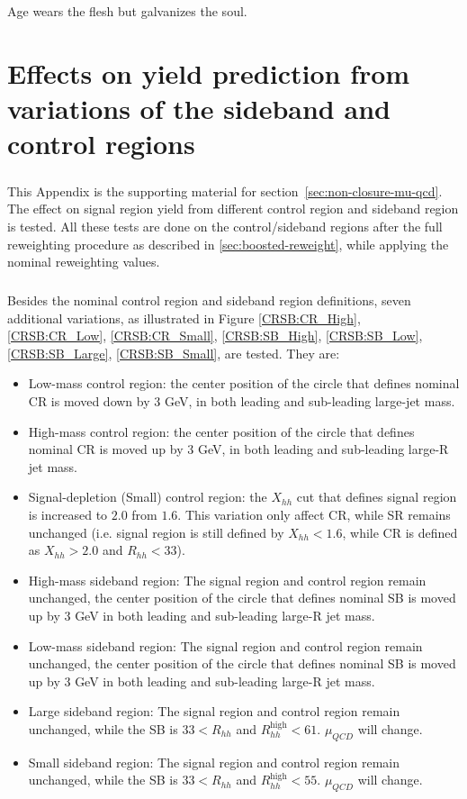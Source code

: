 \begin{savequote}[75mm]
Age wears the flesh but galvanizes the soul.   
\end{savequote}
\chapter{Effects on yield prediction from variations of the sideband and control regions}
\label{app:appendixSysVar}

\paragraph{}
This Appendix is the supporting material for section~\ref{sec:non-closure-mu-qcd}. 
The effect on signal region yield from different control region and sideband region is tested. 
All these tests are done on the control/sideband regions after the full reweighting procedure as described in \ref{sec:boosted-reweight}, while applying the nominal reweighting values.

\paragraph{}
Besides the nominal control region and sideband region definitions, seven additional variations, as illustrated in Figure \ref{CRSB:CR_High}, \ref{CRSB:CR_Low}, \ref{CRSB:CR_Small}, \ref{CRSB:SB_High}, \ref{CRSB:SB_Low}, \ref{CRSB:SB_Large}, \ref{CRSB:SB_Small}, are tested. 
They are:
\begin{itemize}
	\item Low-mass control region: the center position of the circle that defines nominal CR is moved down by 3 GeV, in both leading and sub-leading large-jet mass.
	\item High-mass control region: the center position of the circle that defines nominal CR is moved up by 3 GeV, in both leading and sub-leading large-R jet mass.
	\item Signal-depletion (Small) control region: the $X_{hh}$ cut that defines signal region is increased to $2.0$ from $1.6$. This variation only affect CR, while SR remains unchanged (i.e. signal region is still defined by $X_{hh}<1.6$, while CR is defined as $X_{hh}>2.0$ and $R_{hh}<33$).
	\item High-mass sideband region: The signal region and control region remain unchanged, the center position of the circle that defines nominal SB is moved up by 3 GeV in both leading and sub-leading large-R jet mass.
	\item Low-mass sideband region: The signal region and control region remain unchanged, the center position of the circle that defines nominal SB is moved up by 3 GeV in both leading and sub-leading large-R jet mass.
	\item Large sideband region: The signal region and control region remain unchanged, while the SB is $33 < R_{hh}$ and $ R_{hh}^{\text{high}} < 61$. $\mu_{QCD}$ will change.
	\item Small sideband region: The signal region and control region remain unchanged, while the SB is $33 < R_{hh}$ and $ R_{hh}^{\text{high}} < 55$. $\mu_{QCD}$ will change.
\end{itemize}

